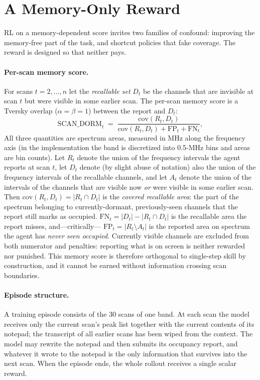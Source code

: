 \documentclass[11pt]{article}
\begin{document}
\section{A Memory-Only Reward}
\label{sec:reward}

RL on a memory-dependent score invites two families of confound: improving the
memory-free part of the task, and shortcut policies that fake coverage. The reward
is designed so that neither pays.

\paragraph{Per-scan memory score.}
For scans $t = 2,\dots,n$ let the \emph{recallable set} $D_t$ be the channels that
are invisible at scan $t$ but were visible in some earlier scan. The per-scan
memory score is a Tversky overlap ($\alpha{=}\beta{=}1$) between the report and
$D_t$:
\begin{equation}
\mathrm{SCAN\_DORM}_t \;=\;
\frac{\mathrm{cov}(R_t, D_t)}
     {\mathrm{cov}(R_t, D_t) + \mathrm{FP}_t + \mathrm{FN}_t},
\end{equation}
All three quantities are spectrum areas, measured in MHz along the frequency axis
(in the implementation the band is discretized into 0.5-MHz bins and areas are bin
counts). Let $R_t$ denote the union of the frequency intervals the agent reports at
scan $t$, let $D_t$ denote (by slight abuse of notation) also the union of the
frequency intervals of the recallable channels, and let $A_t$ denote the union of
the intervals of the channels that are visible now \emph{or} were visible in some
earlier scan. Then $\mathrm{cov}(R_t, D_t) = \lvert R_t \cap D_t \rvert$ is the
\emph{covered recallable area}: the part of the spectrum belonging to
currently-dormant, previously-seen channels that the report still marks as
occupied. $\mathrm{FN}_t = \lvert D_t \rvert - \lvert R_t \cap D_t \rvert$ is the
recallable area the report misses, and---critically---%
$\mathrm{FP}_t = \lvert R_t \setminus A_t \rvert$ is the reported area on spectrum
the agent has \emph{never seen occupied}. Currently visible channels are excluded
from both numerator and penalties: reporting what is on screen is neither rewarded
nor punished. This memory score is therefore orthogonal to single-step skill by
construction, and it cannot be earned without information crossing scan boundaries.

\paragraph{Episode structure.}
A training episode consists of the 30 scans of one band. At each scan the model
receives only the current scan's peak list together with the current contents of
its notepad; the transcript of all earlier scans has been wiped from the context.
The model may rewrite the notepad and then submits its occupancy report, and
whatever it wrote to the notepad is the only information that survives into the
next scan. When the episode ends, the whole rollout receives a single scalar
reward.
\end{document}
